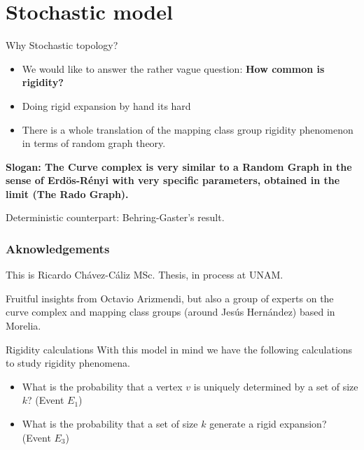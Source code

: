 \documentclass[handout]{beamer}
\theoremstyle{plain}
\begin{document}
\section{Stochastic model}
\begin{frame}{Why Stochastic topology?}
\begin{itemize}
    \item We would like to answer the rather vague question: \textbf{How common is rigidity?}
    \item Doing rigid expansion by hand its hard
    \item There is a  whole translation of the mapping class group rigidity phenomenon in terms of random graph theory.
\end{itemize}    
\end{frame}


\begin{frame}

\textbf{Slogan: The  Curve  complex  is   very  similar  to  a Random Graph  in the  sense  of  Erd\"os-R\'enyi  with  very  specific  parameters,  obtained  in the  limit (The  Rado Graph). \pause }

Deterministic counterpart: Behring-Gaster's result. 

\end{frame}

\begin{frame}\frametitle{Aknowledgements}

\begin{center}
This  is  Ricardo Ch\'avez-C\'aliz  MSc. Thesis, in process at  UNAM. 
\end{center}

Fruitful  insights  from  Octavio Arizmendi, \pause but  also a  group  of  experts on the  curve  complex  and  mapping class  groups (around Jes\'us Hern\'andez) based  in Morelia.

\end{frame}


\begin{frame}{Rigidity calculations}
With this model in mind we have the following calculations to study rigidity phenomena.

\begin{itemize}
\item What is the probability that a vertex $v$ is uniquely determined by a set of size $k$? (Event $E_1$)
 \item What is the probability that a set of size $k$ generate a rigid expansion? (Event $E_3$)
\end{itemize}

\end{frame}
\end{document}
